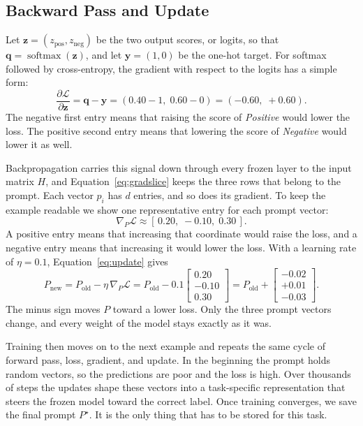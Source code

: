 \documentclass[12pt]{article}
\newcommand{\loss}{\mathcal{L}}
\begin{document}
\subsection{Backward Pass and Update}\label{sec:exgrad}

Let $\mathbf{z}=(z_{\text{pos}},z_{\text{neg}})$ be the two output scores, or logits, so that
$\mathbf{q}=\operatorname{softmax}(\mathbf{z})$, and let $\mathbf{y}=(1,0)$ be the one-hot
target. For softmax followed by cross-entropy, the gradient with respect to the logits has a
simple form:
\begin{equation}
  \frac{\partial\loss}{\partial\mathbf{z}}=\mathbf{q}-\mathbf{y}
  =(0.40-1,\;0.60-0)=(-0.60,\;+0.60).
  \label{eq:softmaxgrad}
\end{equation}
The negative first entry means that raising the score of \emph{Positive} would lower the loss.
The positive second entry means that lowering the score of \emph{Negative} would lower it as
well.

Backpropagation carries this signal down through every frozen layer to the input matrix $H$,
and Equation~\eqref{eq:gradslice} keeps the three rows that belong to the prompt. Each vector
$p_i$ has $d$ entries, and so does its gradient. To keep the example readable we show one
representative entry for each prompt vector:
\[
  \nabla_P\loss\approx[\,0.20,\;-0.10,\;0.30\,].
\]
A positive entry means that increasing that coordinate would raise the loss, and a negative
entry means that increasing it would lower the loss. With a learning rate of $\eta=0.1$,
Equation~\eqref{eq:update} gives
\begin{equation}
  P_{\text{new}}=P_{\text{old}}-\eta\,\nabla_P\loss
  =P_{\text{old}}-0.1\begin{bmatrix}0.20\\-0.10\\0.30\end{bmatrix}
  =P_{\text{old}}+\begin{bmatrix}-0.02\\+0.01\\-0.03\end{bmatrix}.
  \label{eq:exupdate}
\end{equation}
The minus sign moves $P$ toward a lower loss. Only the three prompt vectors change, and every
weight of the model stays exactly as it was.

Training then moves on to the next example and repeats the same cycle of forward pass, loss,
gradient, and update. In the beginning the prompt holds random vectors, so the predictions
are poor and the loss is high. Over thousands of steps the updates shape these vectors into a
task-specific representation that steers the frozen model toward the correct label. Once
training converges, we save the final prompt $P^{\star}$. It is the only thing that has to be
stored for this task.
\end{document}
